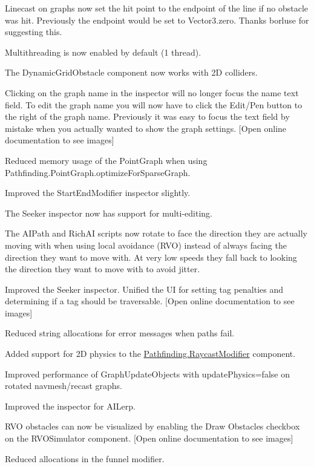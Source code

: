 \begin{DoxyItemize}
\begin{DoxyItemize}
\begin{DoxyItemize}
\item Linecast on graphs now set the hit point to the endpoint of the line if no obstacle was hit. Previously the endpoint would be set to Vector3.\+zero. Thanks borluse for suggesting this.
\item Multithreading is now enabled by default (1 thread).
\item The Dynamic\+Grid\+Obstacle component now works with 2D colliders.
\item Clicking on the graph name in the inspector will no longer focus the name text field. To edit the graph name you will now have to click the Edit/\+Pen button to the right of the graph name. Previously it was easy to focus the text field by mistake when you actually wanted to show the graph settings. \mbox{[}Open online documentation to see images\mbox{]}
\item Reduced memory usage of the Point\+Graph when using Pathfinding.\+Point\+Graph.\+optimize\+For\+Sparse\+Graph.
\item Improved the Start\+End\+Modifier inspector slightly.
\item The Seeker inspector now has support for multi-\/editing.
\item The A\+I\+Path and Rich\+AI scripts now rotate to face the direction they are actually moving with when using local avoidance (R\+VO) instead of always facing the direction they want to move with. At very low speeds they fall back to looking the direction they want to move with to avoid jitter.
\item Improved the Seeker inspector. Unified the UI for setting tag penalties and determining if a tag should be traversable. \mbox{[}Open online documentation to see images\mbox{]}
\item Reduced string allocations for error messages when paths fail.
\item Added support for 2D physics to the \mbox{\hyperlink{class_pathfinding_1_1_raycast_modifier}{Pathfinding.\+Raycast\+Modifier}} component.
\item Improved performance of Graph\+Update\+Objects with update\+Physics=false on rotated navmesh/recast graphs.
\item Improved the inspector for A\+I\+Lerp.
\item R\+VO obstacles can now be visualized by enabling the \textquotesingle{}Draw Obstacles\textquotesingle{} checkbox on the R\+V\+O\+Simulator component. \mbox{[}Open online documentation to see images\mbox{]}
\item Reduced allocations in the funnel modifier.

\end{DoxyItemize}
\end{DoxyItemize}
\end{DoxyItemize}

